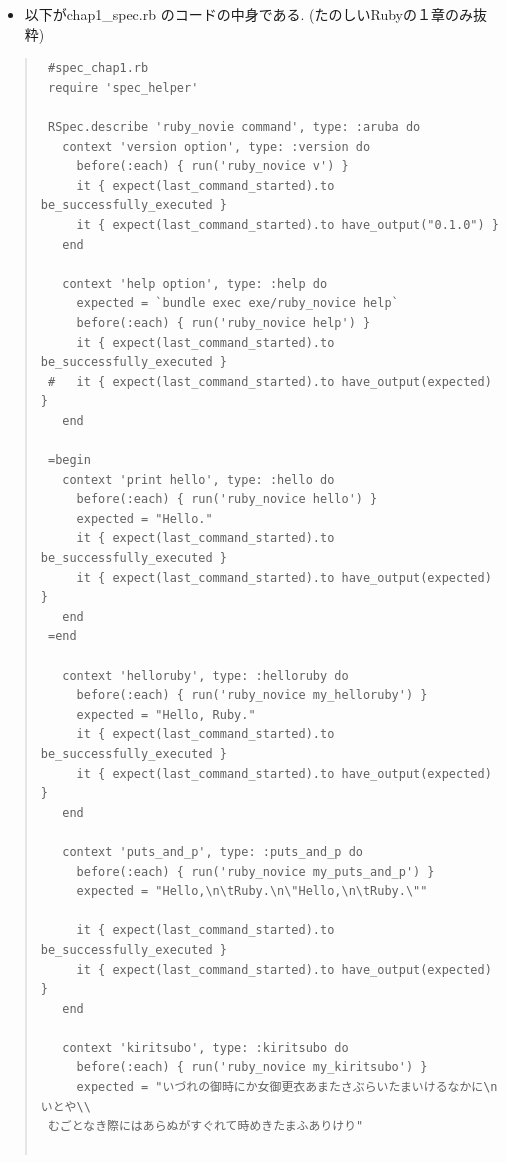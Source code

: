 \begin{itemize}
\item 以下がchap1\_spec.rb のコードの中身である. (たのしいRubyの１章のみ抜粋)
\end{itemize}\begin{quote}\begin{verbatim}
 #spec_chap1.rb
 require 'spec_helper'
 
 RSpec.describe 'ruby_novie command', type: :aruba do
   context 'version option', type: :version do
     before(:each) { run('ruby_novice v') }
     it { expect(last_command_started).to be_successfully_executed }
     it { expect(last_command_started).to have_output("0.1.0") }
   end
 
   context 'help option', type: :help do
     expected = `bundle exec exe/ruby_novice help`
     before(:each) { run('ruby_novice help') }
     it { expect(last_command_started).to be_successfully_executed }
 #   it { expect(last_command_started).to have_output(expected) }               
   end
 
 =begin                                                                          
   context 'print hello', type: :hello do                                        
     before(:each) { run('ruby_novice hello') }                                  
     expected = "Hello."                                                         
     it { expect(last_command_started).to be_successfully_executed }             
     it { expect(last_command_started).to have_output(expected) }    
   end                                                                           
 =end 
 
   context 'helloruby', type: :helloruby do
     before(:each) { run('ruby_novice my_helloruby') }
     expected = "Hello, Ruby."
     it { expect(last_command_started).to be_successfully_executed }
     it { expect(last_command_started).to have_output(expected) }
   end
 
   context 'puts_and_p', type: :puts_and_p do
     before(:each) { run('ruby_novice my_puts_and_p') }
     expected = "Hello,\n\tRuby.\n\"Hello,\n\tRuby.\""
 
     it { expect(last_command_started).to be_successfully_executed }
     it { expect(last_command_started).to have_output(expected) }
   end
 
   context 'kiritsubo', type: :kiritsubo do
     before(:each) { run('ruby_novice my_kiritsubo') }
     expected = "いづれの御時にか女御更衣あまたさぶらいたまいけるなかに\nいとや\\
 むごとなき際にはあらぬがすぐれて時めきたまふありけり"
 

\end{verbatim}
\end{quote}
